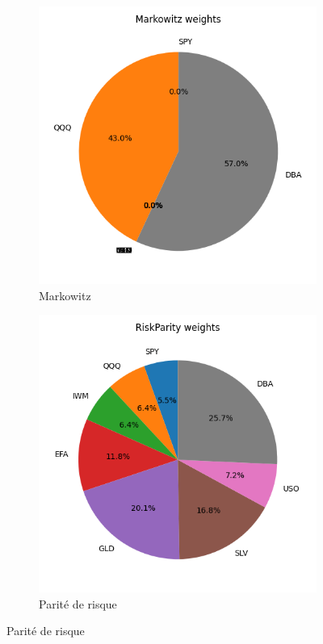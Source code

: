 \documentclass[11pt,a4paper]{article}
\begin{document}
\begin{figure}[h]
  \centering
  \begin{subfigure}[b]{0.48\textwidth}
    \centering
    \includegraphics[width=\linewidth]{../../figures/Markowitz_weights_generated.png}
    \caption{Markowitz}
  \end{subfigure}
  \hfill
  \begin{subfigure}[b]{0.48\textwidth}
    \centering
    \includegraphics[width=\linewidth]{../../figures/RiskParity_weights_generated.png}
    \caption{Parité de risque}
  \end{subfigure}
  

\end{figure}
\end{document}
